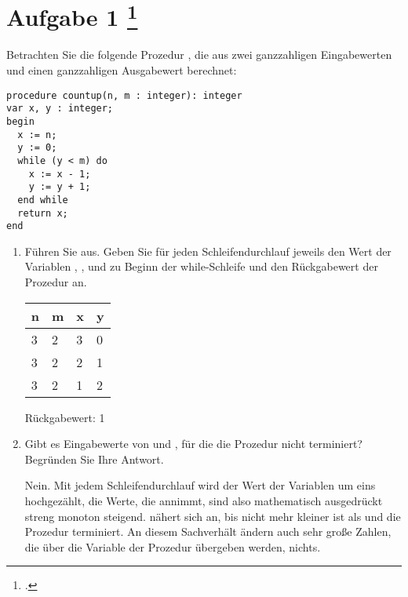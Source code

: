 \documentclass{lehramt-informatik-aufgabe}
\begin{document}

\section{Aufgabe 1
\footcite{66115:2020:09}}

Betrachten Sie die folgende Prozedur , die aus zwei
ganzzahligen Eingabewerten  und  einen ganzzahligen
Ausgabewert berechnet:

\begin{verbatim}
procedure countup(n, m : integer): integer
var x, y : integer;
begin
  x := n;
  y := 0;
  while (y < m) do
    x := x - 1;
    y := y + 1;
  end while
  return x;
end
\end{verbatim}
\begin{enumerate}


\item Führen Sie  aus. Geben Sie für jeden
Schleifendurchlauf jeweils den Wert der Variablen , , 
und  zu Beginn der while-Schleife und den Rückgabewert der Prozedur
an.

\begin{liAntwort}
\begin{tabular}{llll}
n & m & x & y \\\hline
3 & 2 & 3 & 0 \\
3 & 2 & 2 & 1 \\
3 & 2 & 1 & 2 \\
\end{tabular}

Rückgabewert: 1
\end{liAntwort}


\item Gibt es Eingabewerte von  und , für die die Prozedur
 nicht terminiert? Begründen Sie Ihre Antwort.

\begin{liAntwort}
Nein. Mit jedem Schleifendurchlauf wird der Wert der Variablen  um
eins hochgezählt, die Werte, die  annimmt, sind also mathematisch
ausgedrückt streng monoton steigend.  nähert sich 
an, bis  nicht mehr kleiner ist als  und die Prozedur
terminiert. An diesem Sachverhält ändern auch sehr große Zahlen, die
über die Variable  der Prozedur übergeben werden, nichts.
\end{liAntwort}


\end{enumerate}
\end{document}
